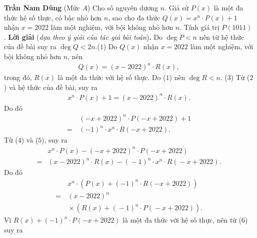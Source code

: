 \begin{multicols}{2}
	\vskip 0.1cm
		\hfill\textbf{\color{thachthuctoanhoc}Trần Nam Dũng}
	\vskip 0.1cm
	{}
	(Mức $A$)
	Cho số nguyên dương $n$. Giả sử $P(x)$ là một đa thức hệ số thực, có bậc nhỏ hơn $n$, sao cho đa thức $Q\left( x \right) = {x^n} \cdot P\left( x \right) + 1$  nhận $x = 2022$ làm một nghiệm, với bội không nhỏ hơn $n$. Tính giá trị  $P(1011)$.
	\vskip 0.05cm
	\textbf{\color{thachthuctoanhoc}Lời giải} (\textit{dựa theo ý giải của tác giả bài toán})\textbf{\color{thachthuctoanhoc}.}
	\vskip 0.05cm
	Do  $\deg P < n$ nên từ hệ thức của đề bài suy ra  $\deg Q < 	2n.$\hfill ($1$)
	\vskip 0.05cm
	Do $Q(x)$  nhận $x = 2022$ làm một nghiệm, với bội không nhỏ hơn $n$, nên
	\begin{align*}
		Q\left( x \right) = {\left( {x - 2022} \right)^n} \cdot R\left( x \right), \tag{$2$}
	\end{align*}
	trong đó, $R(x)$  là một đa thức với hệ số thực. Do ($1$) nên    $\deg R < n.$ \hfill ($3$)
	\vskip 0.05cm
	Từ ($2$) và hệ thức của đề bài, suy ra
	\begin{align*}
		{x^n} \cdot P\left( x \right) + 1 = {\left( {x - 2022} \right)^n} \cdot R\left( x \right). \tag{$4$}
	\end{align*}
	Do đó
	\begin{align*}
		&{\left( { - x + 2022} \right)^n} \cdot P\left( { - x + 2022} \right) + 1\\ = \,&{\left( { - 1} \right)^n} \cdot {x^n} \cdot R\left( { - x + 2022} \right). \tag{$5$}
	\end{align*}
	Từ ($4$) và ($5$), suy ra
	\begin{align*}
		&{x^n} \cdot P\left( x \right) - {\left( { - x + 2022} \right)^n} \cdot P\left( { - x + 2022} \right) \\
		= &{\left( {x \!-\! 2022} \right)^n} \!\cdot\! R\left( x \right) \!-\! {\left( { \!-\! 1}\! \right)^n} \!\cdot\! {x^n} \!\cdot\! R\left( { \!-\! x \!+\! 2022} \right)\!.
	\end{align*}
	Do đó
	\begin{align*}
		&{x^n} \cdot \left( {P\left( x \right) + {{\left( { - 1} \right)}^n} \cdot R\left( { - x + 2022} \right)} \right) \\
		= \,&{\left( {x - 2022} \right)^n} \\
		&\!\times\! \left( {R\left( x \right) \!+\! {{\left( { \!-\! 1} \right)}^n} \!\cdot\! P\left( { \!-\! x \!+\! 2022} \right)} \right). \tag{$6$}
	\end{align*}
	Vì $R\left( x \right) + {\left( { - 1} \right)^n} \cdot P\left( { - x + 2022} \right)$  là một đa thức với hệ số thực, nên từ ($6$) suy ra

\end{multicols}
